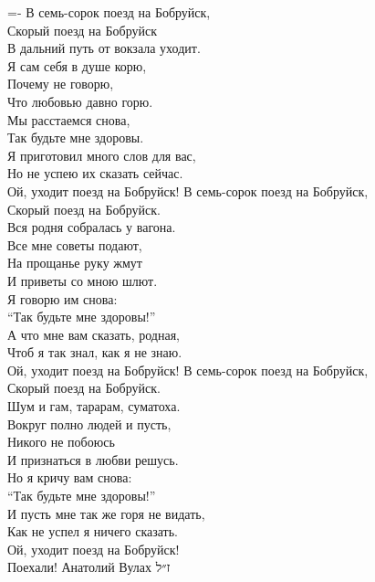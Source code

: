 \documentclass[11pt,twoside]{article}
\begin{document}
{{%
\begin{russian}
\fontsize{8}{9}%
\lineskiplimit=-\maxdimen%
\selectfont%
В семь-сорок поезд на Бобруйск,\\
Скорый поезд на Бобруйск\\
В дальний путь от вокзала уходит.\\
Я сам себя в душе корю,\\
Почему не говорю,\\
Что любовью давно горю.\\
Мы расстаемся снова,\\
Так будьте мне здоровы.\\
Я приготовил много слов для вас,\\
Но не успею их сказать сейчас.\\
Ой, уходит поезд на Бобруйск!
\vfill%
В семь-сорок поезд на Бобруйск,\\
Скорый поезд на Бобруйск.\\
Вся родня собралась у вагона.\\
Все мне советы подают,\\
На прощанье руку жмут\\
И приветы со мною шлют.\\
Я говорю им снова:\\
“Так будьте мне здоровы!”\\
А что мне вам сказать, родная,\\
Чтоб я так знал, как я не знаю.\\
Ой, уходит поезд на Бобруйск!
\vfill%
В семь-сорок поезд на Бобруйск,\\
Скорый поезд на Бобруйск.\\
Шум и гам, тарарам, суматоха.\\
Вокруг полно людей и пусть,\\
Никого не побоюсь\\
И признаться в любви решусь.\\
Но я кричу вам снова:\\
“Так будьте мне здоровы!”\\
И пусть мне так же горя не видать,\\
Как не успел я ничего сказать.\\
Ой, уходит поезд на Бобруйск!\\
Поехали!
\vfill%
\hfill\hfill Анатолий Вулах {\prose ז״ל}\hfill
\end{russian}

}}
\end{document}

